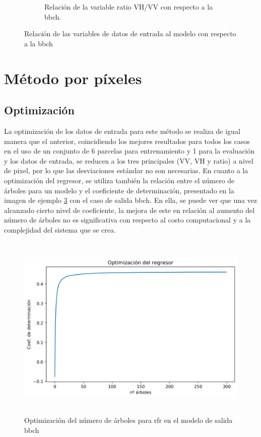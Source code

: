 \begin{figure}[H]
\begin{subfigure}{.45\textwidth}
  \caption{Relación de la variable ratio VH/VV con respecto a la \gls{bbch}.\label{fig:RATIO}}
\end{subfigure}
\caption{Relación de las variables de datos de entrada al modelo con respecto a la \gls{bbch} \label{fig:rel_param}}
\end{figure}

\section{Método por píxeles} 
\subsection{Optimización}
\par La optimización de los datos de entrada para este método se realiza de igual manera que el anterior, coincidiendo los mejores resultados para todos los casos en el uso de un conjunto de 6 parcelas para entrenamiento y 1 para la evaluación y los datos de entrada, se reducen a los tres principales (VV, VH y ratio) a nivel de pixel, por lo que las desviaciones estándar no son necesarias. En cuanto a la optimización del regresor, se utiliza también la relación entre el número de árboles para un modelo y el coeficiente de determinación, presentado en la imagen de ejemplo \ref{fig:opt_pixl} con el caso de salida \gls{bbch}. En ella, se puede ver que una vez alcanzado cierto nivel de coeficiente, la mejora de este en relación al aumento del número de árboles no es significativa con respecto al costo computacional y a la complejidad del sistema que se crea. 
\begin{figure}[h]
    \centering
    \includegraphics[height=9cm]{archivos/tfg/Pixel/opt_tree_bbch_pixel} 
    \caption{Optimización del número de árboles para \gls{rfr} en el modelo de salida \gls{bbch}}
    \label{fig:opt_pixl}
\end{figure}

